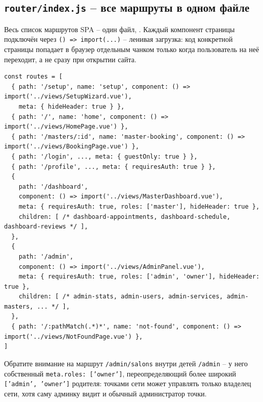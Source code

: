 \subsection{\texttt{router/index.js} -- все маршруты в одном файле}

Весь список маршрутов SPA -- один файл,
. Каждый компонент страницы
подключён через \texttt{() => import(...)} -- ленивая загрузка: код
конкретной страницы попадает в браузер отдельным чанком только когда
пользователь на неё переходит, а не сразу при открытии сайта.
\begin{verbatim}
const routes = [
  { path: '/setup', name: 'setup', component: () => import('../views/SetupWizard.vue'),
    meta: { hideHeader: true } },
  { path: '/', name: 'home', component: () => import('../views/HomePage.vue') },
  { path: '/masters/:id', name: 'master-booking', component: () => import('../views/BookingPage.vue') },
  { path: '/login', ..., meta: { guestOnly: true } },
  { path: '/profile', ..., meta: { requiresAuth: true } },
  {
    path: '/dashboard',
    component: () => import('../views/MasterDashboard.vue'),
    meta: { requiresAuth: true, roles: ['master'], hideHeader: true },
    children: [ /* dashboard-appointments, dashboard-schedule, dashboard-reviews */ ],
  },
  {
    path: '/admin',
    component: () => import('../views/AdminPanel.vue'),
    meta: { requiresAuth: true, roles: ['admin', 'owner'], hideHeader: true },
    children: [ /* admin-stats, admin-users, admin-services, admin-masters, ... */ ],
  },
  { path: '/:pathMatch(.*)*', name: 'not-found', component: () => import('../views/NotFoundPage.vue') },
]
\end{verbatim}
Обратите внимание на маршрут \texttt{/admin/salons} внутри детей
\texttt{/admin} -- у него собственный \texttt{meta.roles: ['owner']},
переопределяющий более широкий \texttt{['admin', 'owner']} родителя:
точками сети может управлять только владелец сети, хотя саму админку
видит и обычный администратор точки.

